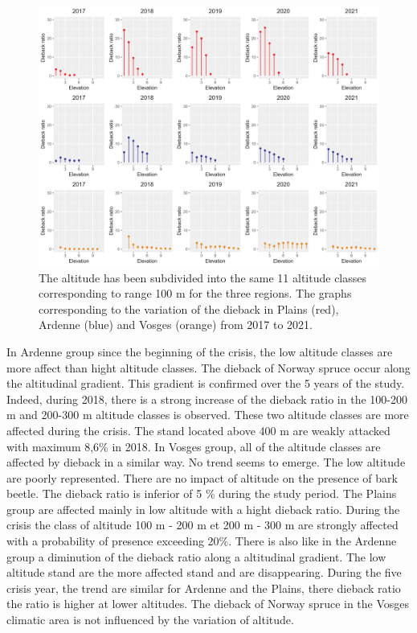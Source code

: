 \documentclass[3p,procedia]{elsarticle}
\begin{document}
\begin{figure}[htbp] 
\centering
	\includegraphics[width=\textwidth]{synthese_color_11_2022.png}
     \caption{The altitude has been subdivided into the same 11 altitude classes corresponding to range 100 m for the three regions. 
The graphs corresponding to the variation of the dieback in Plains (red), Ardenne (blue) and Vosges (orange) from 2017 to 2021.
}
	\label{alti_sco}
\end{figure}

In Ardenne group since the beginning of the crisis, the low altitude classes are more affect than hight altitude classes.
The dieback of Norway spruce occur along the altitudinal gradient.
This gradient is confirmed over the 5 years of the study.
Indeed, during 2018, there is a strong increase of the dieback ratio in the 100-200 m and 200-300 m altitude classes is observed. 
These two altitude classes are more affected during the crisis.
The stand located above 400 m are weakly attacked with maximum 8,6\% in 2018.
In Vosges group, all of the altitude classes are affected by dieback in a similar way.
No trend seems to emerge.
The low altitude are poorly represented. 
There are no impact of altitude on the presence of bark beetle. 
The dieback ratio is inferior of 5 \% during the study period.
The Plains group are affected mainly in low altitude with a hight dieback ratio. 
During the crisis the class of altitude 100 m - 200 m et 200 m - 300 m are strongly affected with a probability of presence exceeding 20\%.
There is also like in the Ardenne group a diminution of the dieback ratio along a altitudinal gradient.
The low altitude stand are the more affected stand and are disappearing.
During the five crisis year, the trend are similar for Ardenne and the Plains, there dieback ratio the ratio is higher at lower altitudes. 
The dieback of Norway spruce in the Vosges climatic area is not influenced by the variation of altitude.
\end{document}
